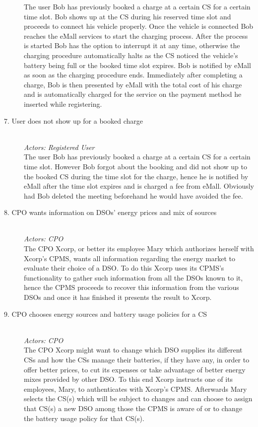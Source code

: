\documentclass[11pt]{article}
\begin{document}
\begin{description}
        The user Bob has previously booked a charge at a certain CS for a certain time slot. Bob shows up at the CS during his reserved time slot and proceeds to connect his vehicle properly. Once the vehicle is connected Bob reaches the eMall services to start the charging process. After the process is started Bob has the option to interrupt it at any time, otherwise the charging procedure automatically halts as the CS noticed the vehicle’s battery being full or the booked time slot expires. Bob is notified by eMall as soon as the charging procedure ends. Immediately after completing a charge, Bob is then presented by eMall with the total cost of his charge and is automatically charged for the service on the payment method he inserted while registering.
    \item [7. User does not show up for a booked charge] \hfill \\
        \textit{Actors: Registered User} \\
        The user Bob has previously booked a charge at a certain CS for a certain time slot. However Bob forgot about the booking and did not show up to the booked CS during the time slot for the charge, hence he is notified by eMall after the time slot expires and is charged a fee from eMall. Obviously had Bob deleted the meeting beforehand he would have avoided the fee.
    \item [8. CPO wants information on DSOs’ energy prices and mix of sources] \hfill \\
        \textit{Actors: CPO} \\
        The CPO Xcorp, or better its employee Mary which authorizes herself with Xcorp's CPMS, wants all information regarding the energy market to evaluate their choice of a DSO. To do this Xcorp uses its CPMS’s functionality to gather such information from all the DSOs known to it, hence the CPMS proceeds to recover this information from the various DSOs and once it has finished it presents the result to Xcorp.
    \item [9. CPO chooses energy sources and battery usage policies for a CS] \hfill \\
        \textit{Actors: CPO} \\
        The CPO Xcorp might want to change which DSO supplies its different CSs and how the CSs manage their batteries, if they have any, in order to offer better prices, to cut its expenses or take advantage of better energy mixes provided by other DSO. To this end Xcorp instructs one of its employees, Mary, to authenticates with Xcorp's CPMS. Afterwards Mary selects the CS(s) which will be subject to changes and can choose to assign that CS(s) a new DSO among those the CPMS is aware of or to change the battery usage policy for that CS(s).

\end{description}
\end{document}
